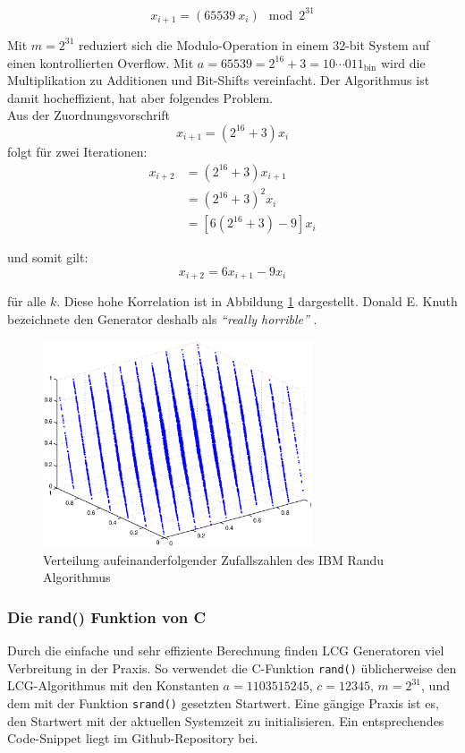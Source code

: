 \documentclass{book}
\begin{document}
\begin{refsection}
\begin{equation}
	x_{i+1} = \left( 65539 \: x_i \right) \mod{2^{31}}
	\label{equ:ibm_randu}
\end{equation}

Mit $m = 2^{31}$ reduziert sich die Modulo-Operation in einem 32-bit System auf einen kontrollierten Overflow. Mit $a = 65539 = 2^{16} + 3 = 10\cdots011_{\text{bin}}$ wird die Multiplikation zu Additionen und Bit-Shifts vereinfacht. Der Algorithmus ist damit hocheffizient, hat aber folgendes Problem. \\

Aus der Zuordnungsvorschrift
\begin{equation*}
	x_{i+1} = (2^{16} + 3) x_i
\end{equation*}
folgt für zwei Iterationen:
\begin{align*}
	x_{i+2} &= (2^{16} + 3) x_{i+1} \\
	 &= (2^{16} + 3)^2 x_i \\
	 &= [6 (2^{16} + 3) - 9] x_i
\end{align*}

und somit gilt:
\begin{equation}
	x_{i+2} = 6 x_{i+1} - 9 x_i
\end{equation}

für alle $k$. Diese hohe Korrelation ist in Abbildung \ref{fig:IBMRandu} dargestellt. Donald E. Knuth bezeichnete den Generator deshalb als \textit{``really horrible''} \cite[p.173]{rng:KnuthVol2}. \\

\begin{figure}[htbp]
	\centering
	\includegraphics[width=8cm]{images/ibm_randu.eps}
	\caption{Verteilung aufeinanderfolgender Zufallszahlen des IBM Randu Algorithmus}
	\label{fig:IBMRandu}
\end{figure}

\subsubsection{Die rand() Funktion von C}
Durch die einfache und sehr effiziente Berechnung finden LCG Generatoren viel Verbreitung in der Praxis. So verwendet die C-Funktion \texttt{rand()} üblicherweise den LCG-Algorithmus mit den Konstanten $a=1103515245$, $c=12345$, $m=2^{31}$, und dem mit der Funktion \texttt{srand()} gesetzten Startwert. \cite{rng:randFunction} Eine gängige Praxis ist es, den Startwert mit der aktuellen Systemzeit zu initialisieren. Ein entsprechendes Code-Snippet liegt im Github-Repository bei. \cite{rng:githubRepo} \\


\end{refsection}
\end{document}
